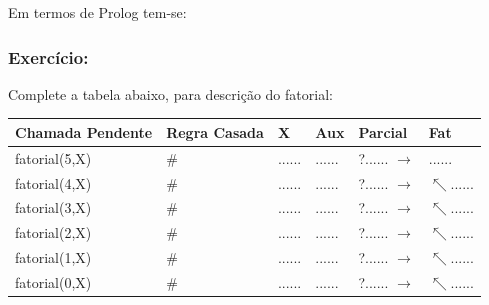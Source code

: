 \documentclass[sans]{beamer}
\begin{document}
\begin{frame}
\begin{block}{Em termos de Prolog tem-se:}



\end{block}
\end{frame}

\begin{frame}[fragile]
\frametitle{Exercício:}
\begin{block}{Complete a tabela abaixo, para descrição do fatorial:}

{\small
\begin{center}
\begin{tabular}
[c]{|l|l|l|l|l|l|}\hline
\textbf{Chamada Pendente} & \textbf{Regra Casada} & \textbf{X} & \textbf{Aux} & \textbf{Parcial} & \textbf{Fat} \\ \hline
{\small fatorial}(5,X) & \# & ...... & ...... & ?...... $\rightarrow$ &
......\\\hline
{\small fatorial}(4,X) & \# & ...... & ...... & ?...... $\rightarrow$ &
$\nwarrow$......\\\hline
{\small fatorial}(3,X) & \# & ...... & ...... & ?...... $\rightarrow$ &
$\nwarrow$......\\\hline
{\small fatorial}(2,X) & \# & ...... & ...... & ?...... $\rightarrow$ &
$\nwarrow$......\\\hline
{\small fatorial}(1,X) & \# & ...... & ...... & ?...... $\rightarrow$ &
$\nwarrow$......\\\hline
{\small fatorial}(0,X) & \# & ...... & ...... & ?...... $\rightarrow$ &
$\nwarrow$......\\\hline
\end{tabular}
\end{center}
}

\end{block}   
\end{frame}

\end{document}
